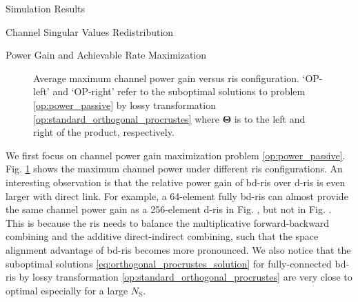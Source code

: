 \documentclass[journal]{IEEEtran}
\begin{document}
\begin{section}{Simulation Results}
\begin{subsection}{Channel Singular Values Redistribution}
	\end{subsection}

	\begin{subsection}{Power Gain and Achievable Rate Maximization}
		\begin{figure}[!t]
			\centering
			\caption{
				Average maximum channel power gain versus \gls{ris} configuration.
				`OP-left' and `OP-right' refer to the suboptimal solutions to problem \eqref{op:power_passive} by lossy transformation \eqref{op:standard_orthogonal_procrustes} where $\mathbf{\Theta}$ is to the left and right of the product, respectively.
			}
			\label{fg:power_sx}
		\end{figure}

		We first focus on channel power gain maximization problem \eqref{op:power_passive}.
		Fig. \ref{fg:power_sx} shows the maximum channel power under different \gls{ris} configurations.
		An interesting observation is that the relative power gain of \gls{bd}-\gls{ris} over \gls{d}-\gls{ris} is even larger with direct link.
		For example, a 64-element fully \gls{bd}-\gls{ris} can almost provide the same channel power gain as a 256-element \gls{d}-\gls{ris} in Fig. , but not in Fig. .
		This is because the \gls{ris} needs to balance the multiplicative forward-backward combining and the additive direct-indirect combining, such that the space alignment advantage of \gls{bd}-\gls{ris} becomes more pronounced.
		We also notice that the suboptimal solutions \eqref{eq:orthogonal_procrustes_solution} for fully-connected \gls{bd}-\gls{ris} by lossy transformation \eqref{op:standard_orthogonal_procrustes} are very close to optimal especially for a large $N_\mathrm{S}$.


\end{subsection}
\end{section}
\end{document}
